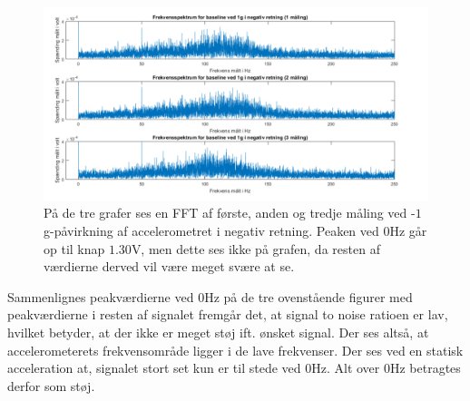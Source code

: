 \begin{figure}[H]
	\centering
	\includegraphics[scale=0.5]{figures/cProblemloesning/Pilotforsoeg_FrekvensN.png}
	\caption{På de tre grafer ses en FFT af første, anden og tredje måling ved -$1$ g-påvirkning af accelerometret i negativ retning. Peaken ved $0$Hz går op til knap $1.30$V, men dette ses ikke på grafen, da resten af værdierne derved vil være meget svære at se.}
	\label{Fig:Pilot_FFTN}
\end{figure}

\noindent Sammenlignes peakværdierne ved $0$Hz på de tre ovenstående figurer med peakværdierne i resten af signalet fremgår det, at signal to noise ratioen er lav, hvilket betyder, at der ikke er meget støj ift. ønsket signal. Der ses altså, at accelerometerets frekvensområde ligger i de lave frekvenser. Der ses ved en statisk acceleration at, signalet stort set kun er til stede ved $0$Hz. Alt over $0$Hz betragtes derfor som støj. 

